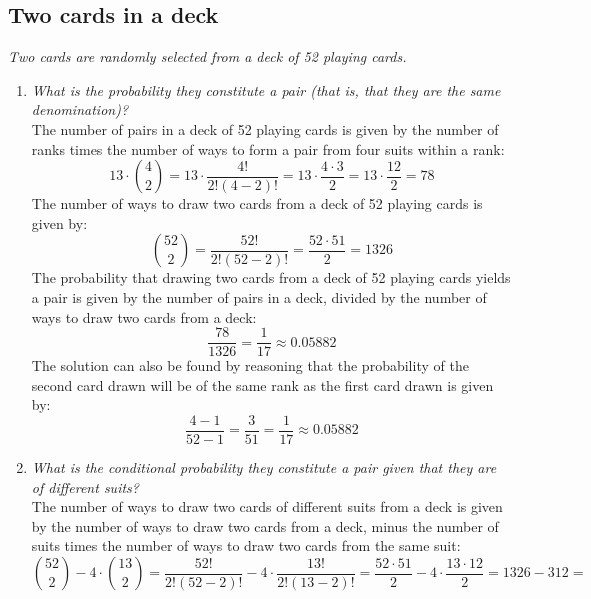 \subsection{Two cards in a deck}

\textit{Two cards are randomly selected from a deck of 52 playing cards.}

\begin{enumerate}[label=\alph*)]
\item \textit{What is the probability they constitute a pair (that is, that they are the same denomination)?}\\
The number of pairs in a deck of 52 playing cards is given by the number of ranks times the number of ways to form a pair from four suits within a rank:
\begin{equation}
\label{eq:number_of_pairs}
13 \cdot \binom{4}{2} =
13 \cdot \frac{4!}{2!(4 - 2)!} =
13 \cdot \frac{4 \cdot 3}{2} =
13 \cdot \frac{12}{2} =
78
\end{equation}
The number of ways to draw two cards from a deck of 52 playing cards is given by:
\begin{equation}
\binom{52}{2} =
\frac{52!}{2!(52 - 2)!} =
\frac{52 \cdot 51}{2} =
1326
\end{equation}
The probability that drawing two cards from a deck of 52 playing cards yields a pair is given by the number of pairs in a deck, divided by the number of ways to draw two cards from a deck:
\begin{equation}
\frac{78}{1326} = \frac{1}{17} \approx 0.05882
\end{equation}
The solution can also be found by reasoning that the probability of the second card drawn will be of the same rank as the first card drawn is given by:
\begin{equation}
\frac{4 - 1}{52 - 1} = \frac{3}{51} = \frac{1}{17} \approx 0.05882
\end{equation}
\item \textit{What is the conditional probability they constitute a pair given that they are of different suits?}\\
The number of ways to draw two cards of different suits from a deck is given by the number of ways to draw two cards from a deck, minus the number of suits times the number of ways to draw two cards from the same suit:
\begin{equation}
\binom{52}{2} - 4 \cdot \binom{13}{2} =
\frac{52!}{2!(52 - 2)!} - 4 \cdot \frac{13!}{2!(13 - 2)!} =
\frac{52 \cdot 51}{2} - 4 \cdot \frac{13 \cdot 12}{2} =
1326 - 312 =

\end{equation}
\end{enumerate}
